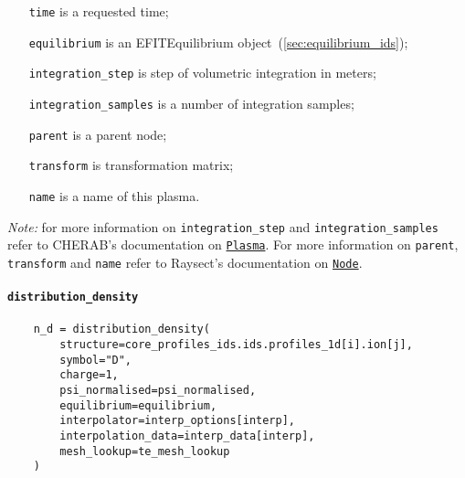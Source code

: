 \documentclass[../main.tex]{subfiles}
\begin{document}
\begin{itemize}[align=left]
    \item[\texttt{time}] is a requested time;
    \item[\texttt{equilibrium}] is an EFITEquilibrium object~(\cref{sec:equilibrium_ids});
    \item[\texttt{integration\_step}] is step of volumetric integration in meters;
    \item[\texttt{integration\_samples}] is a number of integration samples;
    \item[\texttt{parent}] is a parent node;
    \item[\texttt{transform}] is transformation matrix;
    \item[\texttt{name}] is a name of this plasma.
\end{itemize}
\emph{Note: } for more information on \texttt{integration\_step} and \texttt{integration\_samples} refer to CHERAB's documentation on \href{https://cherab.github.io/documentation/plasmas/edge_plasma_classes.html?highlight=plasma#cherab.edge.Plasma}{\texttt{Plasma}}.
For more information on \texttt{parent}, \texttt{transform} and \texttt{name} refer to Raysect's documentation on \href{https://raysect.github.io/documentation/api_reference/edge/raysect_edge_scenegraph.html?highlight=node#raysect.edge.scenegraph.node.Node}{\texttt{Node}}.

\paragraph{\texttt{distribution\_density}}%
\label{par:distribution_density}

\begin{verbatim}
    n_d = distribution_density(
        structure=core_profiles_ids.ids.profiles_1d[i].ion[j],
        symbol="D",
        charge=1,
        psi_normalised=psi_normalised,
        equilibrium=equilibrium,
        interpolator=interp_options[interp],
        interpolation_data=interp_data[interp],
        mesh_lookup=te_mesh_lookup
    )
\end{verbatim}
\end{document}
